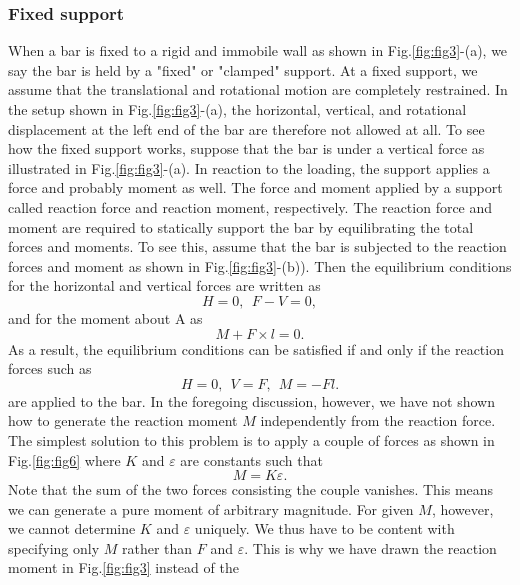 ﻿\documentclass[10pt,a4j]{article}
\begin{document}
\subsubsection{Fixed support}
When a bar is fixed to a rigid and immobile wall as shown in Fig.\ref{fig:fig3}-(a), 
we say the bar is held by a "fixed" or "clamped" support. 
At a fixed support, we assume that the translational and rotational motion 
are completely restrained. In the setup shown in Fig.\ref{fig:fig3}-(a),  
the horizontal, vertical, and rotational displacement at the left end of 
the bar are therefore not allowed at all. To see how the fixed support works, 
suppose that the bar is under a vertical force as illustrated in Fig.\ref{fig:fig3}-(a).
In reaction to the loading, the support applies a force and probably moment as well.   
The force and moment applied by a support called reaction force and reaction moment, respectively. 
The reaction force and moment are required to statically support the bar by 
equilibrating the total forces and moments. 
To see this, assume that the bar is subjected to the reaction forces and  moment 
as shown in Fig.\ref{fig:fig3}-(b)). Then the equilibrium conditions for the horizontal 
and vertical forces are written as 
\begin{equation}
	H=0, \ \ F-V=0, 
	\label{eqn:}
\end{equation}
and for the moment about A as 
\begin{equation}
	M+F\times l =0.
	\label{eqn:}
\end{equation}
As a result, the equilibrium conditions can be satisfied if and only if 
the reaction forces such as  
\begin{equation}
	H=0, \ \ V=F, \ \ M=-Fl. 
	\label{eqn:}
\end{equation}
are applied to the bar. In the foregoing discussion, however,   
we have not shown how to generate the reaction moment $M$ independently  
from the reaction force. 
The simplest solution to this problem is to apply a couple of forces 
as shown in Fig.\ref{fig:fig6} where $K$ and $\varepsilon$ are 
constants such that 
\begin{equation}
	M=K\varepsilon.
	\label{eqn:}
\end{equation}
Note that the sum of the two forces consisting the couple vanishes. 
This means we can generate a pure moment of arbitrary magnitude.
For given $M$, however, we cannot determine $K$ and $\varepsilon$ uniquely. 
We thus have to be content with specifying only $M$ rather than $F$ and $\varepsilon$. 
This is why we have drawn the reaction moment in Fig.\ref{fig:fig3} instead of the 
\end{document}
